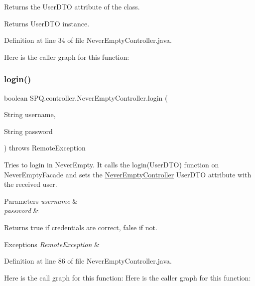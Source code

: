 Returns the User\+D\+TO attribute of the class. \begin{DoxyReturn}{Returns}
User\+D\+TO instance. 
\end{DoxyReturn}


Definition at line 34 of file Never\+Empty\+Controller.\+java.

Here is the caller graph for this function\+:
\mbox{\label{class_s_p_q_1_1controller_1_1_never_empty_controller_adb8f5dbbfedb5f3c231de53dccc88899}} 
\subsubsection{\texorpdfstring{login()}{login()}}
{\footnotesize\ttfamily boolean S\+P\+Q.\+controller.\+Never\+Empty\+Controller.\+login (\begin{DoxyParamCaption}\item[{String}]{username,  }\item[{String}]{password }\end{DoxyParamCaption}) throws Remote\+Exception}

Tries to login in Never\+Empty. It calls the login(\+User\+D\+T\+O) function on Never\+Empty\+Facade and sets the \mbox{\hyperlink{class_s_p_q_1_1controller_1_1_never_empty_controller}{Never\+Empty\+Controller}} User\+D\+TO attribute with the received user. 
\begin{DoxyParams}{Parameters}
{\em username} & \\
\hline
{\em password} & \\
\hline
\end{DoxyParams}
\begin{DoxyReturn}{Returns}
true if credentials are correct, false if not. 
\end{DoxyReturn}

\begin{DoxyExceptions}{Exceptions}
{\em Remote\+Exception} & \\
\hline
\end{DoxyExceptions}


Definition at line 86 of file Never\+Empty\+Controller.\+java.

Here is the call graph for this function\+:
Here is the caller graph for this function\+:
\mbox{\label{class_s_p_q_1_1controller_1_1_never_empty_controller_aefc0dae2c43c2960719176d390f3ad9c}} 
